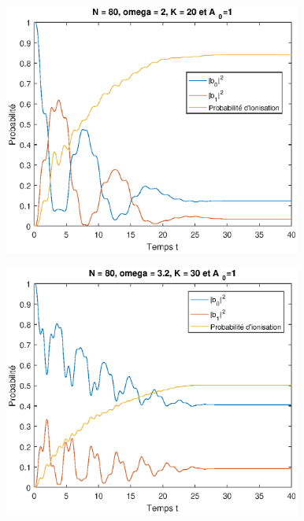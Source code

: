 \documentclass{report}
\begin{document}
\begin{figure}
\begin{center}
  \includegraphics[height=8.3cm]{N80_W2_K20_A1.eps}
      \end{center}
  \caption{}
  \label{fig_N80_W2_K20_A1}
\end{figure}

\begin{figure}
\begin{center}
  \includegraphics[height=8.3cm]{N80_W32_K30_A1.eps}
      \end{center}
  \caption{}
  \label{fig_N80_W32_K30_A1}
\end{figure}
\end{document}

